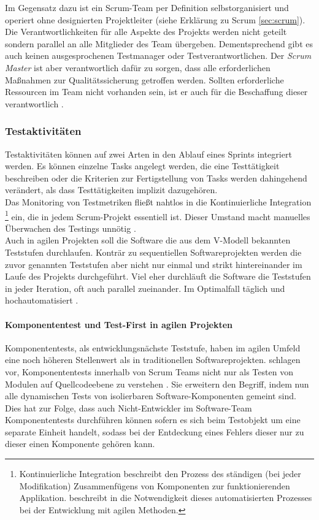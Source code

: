 Im Gegensatz dazu ist ein Scrum-Team per Definition selbstorganisiert und operiert ohne designierten Projektleiter (siehe Erklärung zu Scrum \ref{sec:scrum}). Die Verantwortlichkeiten für alle Aspekte des Projekts werden nicht geteilt sondern parallel an alle Mitglieder des Team übergeben. Dementsprechend gibt es auch keinen ausgesprochenen Testmanager oder Testverantwortlichen. Der \textit{Scrum Master} ist aber verantwortlich dafür zu sorgen, dass alle erforderlichen Maßnahmen zur Qualitätssicherung getroffen werden. Sollten erforderliche Ressourcen im Team nicht vorhanden sein, ist er auch für die Beschaffung dieser verantwortlich \cite{linz_testing_2014}.\\

\subsubsection{Testaktivitäten}
Testaktivitäten können auf zwei Arten in den Ablauf eines Sprints integriert werden. Es können einzelne Tasks angelegt werden, die eine Testtätigkeit beschreiben oder die Kriterien zur Fertigstellung von Tasks werden dahingehend verändert, als dass Testtätigkeiten implizit dazugehören.\\
Das Monitoring von Testmetriken fließt nahtlos in die Kontinuierliche Integration \footnote{Kontinuierliche Integration beschreibt den Prozess des ständigen (bei jeder Modifikation) Zusammenfügens von Komponenten zur funktionierenden Applikation. \citeauthor{linz_testing_2014} beschreibt in \cite{linz_testing_2014} die Notwendigkeit dieses automatisierten Prozesses bei der Entwicklung mit agilen Methoden.} ein, die in jedem Scrum-Projekt essentiell ist. Dieser Umstand macht manuelles Überwachen des Testings unnötig \cite{linz_testing_2014}.\\
Auch in agilen Projekten soll die Software die aus dem V-Modell bekannten Teststufen durchlaufen. Konträr zu sequentiellen Softwareprojekten werden die zuvor genannten Teststufen aber nicht nur einmal und strikt hintereinander im Laufe des Projekts durchgeführt. Viel eher durchläuft die Software die Teststufen in jeder Iteration, oft auch parallel zueinander. Im Optimalfall täglich und hochautomatisiert \cite{linz_testing_2014}.

\paragraph{Komponententest und Test-First in agilen Projekten}   
Komponententests, als entwicklungsnächste Teststufe, haben im agilen Umfeld eine noch höheren Stellenwert als in traditionellen Softwareprojekten. \citeauthor{spillner_software_2014} schlagen vor, Komponententests innerhalb von Scrum Teams nicht nur als Testen von Modulen auf Quellcodeebene zu verstehen \cite{spillner_software_2014}. Sie erweitern den Begriff, indem nun alle dynamischen Tests von isolierbaren Software-Komponenten gemeint sind. Dies hat zur Folge, dass auch Nicht-Entwickler im Software-Team Komponententests durchführen können sofern es sich beim Testobjekt um eine separate Einheit handelt, sodass bei der Entdeckung eines Fehlers dieser nur zu dieser einen Komponente gehören kann.\\

